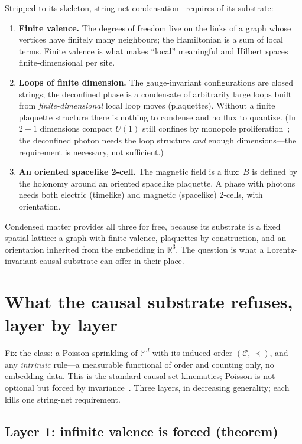 \documentclass[aps,prd,reprint,nofootinbib,superscriptaddress,floatfix]{revtex4-2}
\begin{document}
Stripped to its skeleton, string-net condensation~\cite{LevinWen2005,LevinWenColloquium}
requires of its substrate:

\begin{enumerate}
\item \textbf{Finite valence.} The degrees of freedom live on the links of a graph whose
vertices have finitely many neighbours; the Hamiltonian is a sum of local terms. Finite
valence is what makes ``local'' meaningful and Hilbert spaces finite-dimensional per
site.
\item \textbf{Loops of finite dimension.} The gauge-invariant configurations are closed
strings; the deconfined phase is a condensate of arbitrarily large loops built from
\emph{finite-dimensional} local loop moves (plaquettes). Without a finite plaquette
structure there is nothing to condense and no flux to quantize. (In $2{+}1$ dimensions
compact $U(1)$ still confines by monopole proliferation~\cite{Polyakov1977}; the
deconfined photon needs the loop structure \emph{and} enough dimensions---the
requirement is necessary, not sufficient.)
\item \textbf{An oriented spacelike 2-cell.} The magnetic field is a flux: $B$ is
defined by the holonomy around an oriented spacelike plaquette. A phase with photons
needs both electric (timelike) and magnetic (spacelike) 2-cells, with orientation.
\end{enumerate}

Condensed matter provides all three for free, because its substrate is a fixed spatial
lattice: a graph with finite valence, plaquettes by construction, and an orientation
inherited from the embedding in $\mathbb{R}^3$. The question is what a Lorentz-invariant
causal substrate can offer in their place.

\section{What the causal substrate refuses, layer by layer}

Fix the class: a Poisson sprinkling of $\mathbb{M}^d$ with its induced order
$(\mathcal{C},\prec)$, and any \emph{intrinsic} rule---a measurable functional of order
and counting only, no embedding data. This is the standard causal set kinematics; Poisson
is not optional but forced by invariance~\cite{BHS2009}. Three layers, in decreasing
generality; each kills one string-net requirement.

\subsection{Layer 1: infinite valence is forced (theorem)}
\end{document}
